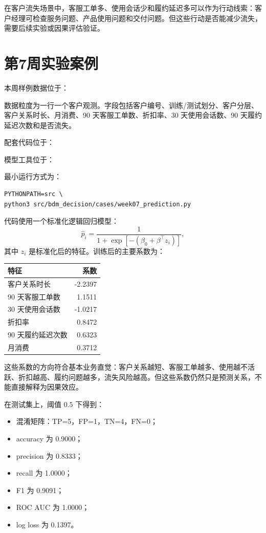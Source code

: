 \documentclass[UTF8,fontset=fandol,openany,zihao=-4]{ctexbook}
\begin{document}
在客户流失场景中，客服工单多、使用会话少和履约延迟多可以作为行动线索：客户经理可检查服务问题、产品使用问题和交付问题。但这些行动是否能减少流失，需要后续实验或因果评估验证。

\section{第7周实验案例}

本周样例数据位于：
\begin{center}
\end{center}
数据粒度为一行一个客户观测。字段包括客户编号、训练/测试划分、客户分层、客户关系时长、月消费、90 天客服工单数、折扣率、30 天使用会话数、90 天履约延迟次数和是否流失。

配套代码位于：
\begin{center}
\end{center}
模型工具位于：
\begin{center}
\qquad
{}
\end{center}

最小运行方式为：
\begin{lstlisting}[style=pythonstyle,caption={运行第7周预测模型案例}]
PYTHONPATH=src \
python3 src/bdm_decision/cases/week07_prediction.py
\end{lstlisting}

代码使用一个标准化逻辑回归模型：
\[
  \hat p_i
  =
  \frac{1}{1+\exp[-(\beta_0+\beta^\top z_i)]},
\]
其中 \(z_i\) 是标准化后的特征。训练后的主要系数为：
\begin{center}
\begin{tabular}{lr}
\toprule
特征 & 系数\\
\midrule
客户关系时长 & -2.2397\\
90 天客服工单数 & 1.1511\\
30 天使用会话数 & -1.0217\\
折扣率 & 0.8472\\
90 天履约延迟次数 & 0.6323\\
月消费 & 0.3712\\
\bottomrule
\end{tabular}
\end{center}
这些系数的方向符合基本业务直觉：客户关系越短、客服工单越多、使用越不活跃、折扣越高、履约问题越多，流失风险越高。但这些系数仍然只是预测关系，不能直接解释为因果效应。

在测试集上，阈值 \(0.5\) 下得到：
\begin{itemize}
  \item 混淆矩阵：TP=5，FP=1，TN=4，FN=0；
  \item accuracy 为 0.9000；
  \item precision 为 0.8333；
  \item recall 为 1.0000；
  \item F1 为 0.9091；
  \item ROC AUC 为 1.0000；
  \item log loss 为 0.1397。
\end{itemize}
\end{document}
